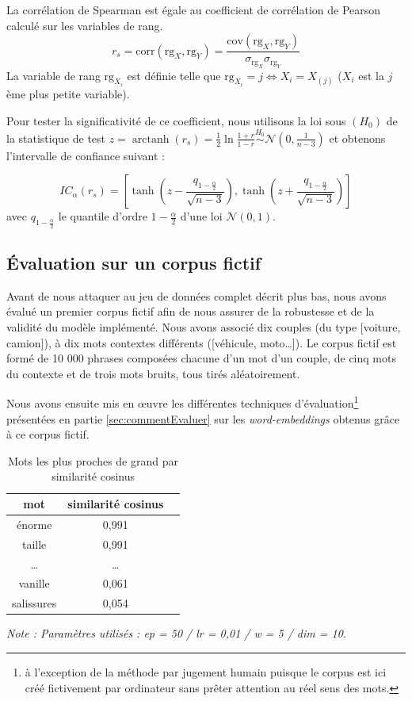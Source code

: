 \documentclass[11pt,french,french]{article}
\let\rmarkdownfootnote\footnote%
\def\footnote{\protect\rmarkdownfootnote}
\DeclareMathOperator{\arctanh}{arctanh}
\begin{document}
La corrélation de Spearman est égale au coefficient de corrélation de
Pearson calculé sur les variables de rang. \[
r_s = \mathrm{corr}(\mathrm{rg}_X, \mathrm{rg}_Y) = 
\frac{\mathrm{cov}(\mathrm{rg}_X, \mathrm{rg}_Y)}{
\sigma_{\mathrm{rg}_X} \sigma_{\mathrm{rg}_Y}
}
\] La variable de rang \(\mathrm{rg}_{X_i}\) est définie telle que
\(\mathrm{rg}_{X_i}=j \iff X_i = X_{(j)}\) (\(X_i\) est la \(j\)ème plus
petite variable).

Pour tester la significativité de ce coefficient, nous utilisons la loi
sous \((H_0)\) de la statistique de test
\(z = \arctanh(r_s) = \frac{1}{2} \ln\frac{1+r}{1-r} \overset{H_0}{\sim}\mathcal{N}(0, \frac{1}{n-3})\)
et obtenons l'intervalle de confiance suivant :

\[
IC_\alpha (r_s) = \left[\tanh\left(z-\frac{q_{1-\frac{\alpha}{2}}}{\sqrt{n-3}}\right),
\tanh\left(z+\frac{q_{1-\frac{\alpha}{2}}}{\sqrt{n-3}}\right)\right]
\] avec \(q_{1-\frac{\alpha}{2}}\) le quantile d'ordre
\(1-\frac{\alpha}{2}\) d'une loi \(\mathcal{N}(0, 1)\).

\subsection{Évaluation sur un corpus fictif}\label{sec:corpusFictif}

Avant de nous attaquer au jeu de données complet décrit plus bas, nous
avons évalué un premier corpus fictif afin de nous assurer de la
robustesse et de la validité du modèle implémenté. Nous avons associé
dix couples (du type {[}voiture, camion{]}), à dix mots contextes
différents ({[}véhicule, moto\dots{]}). Le corpus fictif est formé de 10
000 phrases composées chacune d'un mot d'un couple, de cinq mots du
contexte et de trois mots bruits, tous tirés aléatoirement.

Nous avons ensuite mis en œuvre les différentes techniques
d'évaluation\footnote{à l'exception de la méthode par \og jugement
  humain \fg{} puisque le corpus est ici créé fictivement par ordinateur
  sans prêter attention au réel sens des mots.} présentées en partie
\ref{sec:commentEvaluer} sur les \emph{word-embeddings} obtenus grâce à
ce corpus fictif.

\begin{table}
\begin{center}
\begin{tabular}{|c|c|c|}
    \hline
    mot & similarité cosinus \tabularnewline
    \hline
    énorme & 0,991   \tabularnewline
    taille & 0,991   \tabularnewline
    \dots & \dots    \tabularnewline
    vanille & 0,061   \tabularnewline
    salissures & 0,054   \tabularnewline
    \hline
 \end{tabular}
\captionsetup{margin=0cm,format=hang,justification=justified}
\caption{Mots les plus proches de \og grand \fg{} par similarité cosinus}\label{table:tableau_evaluation}
\end{center}
\vspace{-0.3cm}
\footnotesize
\emph{Note : Paramètres utilisés : ep = 50 / lr = 0,01 / w = 5 / dim = 10.}
\end{table}
\end{document}
